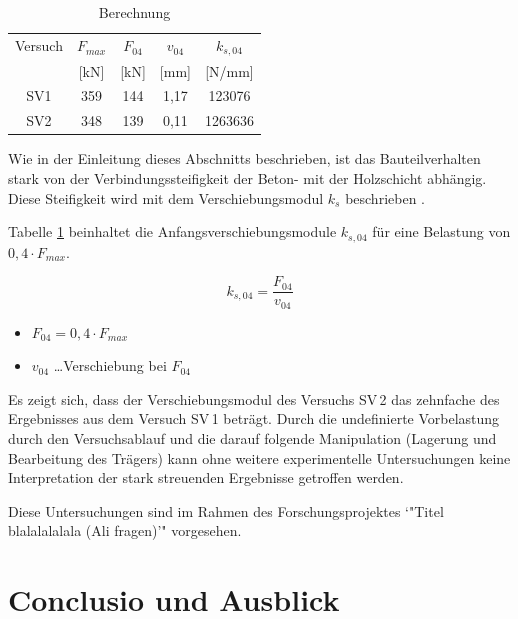 \begin{table}[h]
\caption{Berechnung}
\begin{center}
\begin{tabular}{|c|c|c|c|c|}

\hline 
Versuch & $F_{max}$  & $F_{04}$ & $v_{04}$ & $k_{s,04}$  \\ 

&  [kN] & [kN] & [mm] & [N/mm]    \\ 
\hline\hline
SV1 & 359  & 144 & 1,17 & 123076    \\ 
\hline 
SV2 & 348  & 139 & 0,11 & 1263636   \\ 

\hline 
\end{tabular} 
\end{center}
\label{tab:Schubversuche}
\end{table}

Wie in der Einleitung dieses Abschnitts beschrieben, ist das Bauteilverhalten stark von der Verbindungssteifigkeit der Beton- mit der Holzschicht abhängig. Diese Steifigkeit wird mit dem Verschiebungsmodul $k_{s}$ beschrieben \cite{DINEN26891}.

Tabelle \ref{tab:Schubversuche} beinhaltet die Anfangsverschiebungsmodule $k_{s,04}$ für eine Belastung von $0,4 \cdot F_{max}$.

\begin{equation}
k_{s,04} = \dfrac{F_{04}}{v_{04}}
\end{equation}

\begin{itemize}
\item $F_{04} = 0,4 \cdot F_{max}$
\item $v_{04}$ \ldots Verschiebung bei $F_{04}$
\end{itemize}

Es zeigt sich, dass der Verschiebungsmodul des Versuchs SV\,2 das zehnfache des Ergebnisses aus dem Versuch SV\,1 beträgt. Durch die undefinierte Vorbelastung durch den Versuchsablauf und die darauf folgende Manipulation (Lagerung und Bearbeitung des Trägers) kann ohne weitere experimentelle Untersuchungen keine Interpretation der stark streuenden Ergebnisse getroffen werden.

Diese Untersuchungen sind im Rahmen des Forschungsprojektes `"Titel blalalalalala (Ali fragen)'" vorgesehen.




\clearpage

\section{Conclusio und Ausblick}
